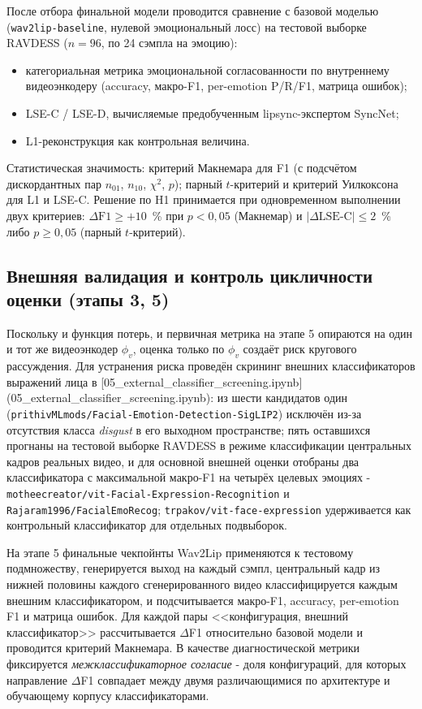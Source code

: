 \documentclass[a4paper, 12pt, oneside, openany]{article}
\begin{document}
После отбора финальной модели проводится сравнение с базовой моделью (\texttt{wav2lip-baseline}, нулевой эмоциональный лосс) на тестовой выборке RAVDESS ($n=96$, по 24 сэмпла на эмоцию):
\begin{itemize}
\item категориальная метрика эмоциональной согласованности по внутреннему видеоэнкодеру (accuracy, макро-F1, per-emotion P/R/F1, матрица ошибок);
\item LSE-C / LSE-D, вычисляемые предобученным lipsync-экспертом SyncNet;
\item L1-реконструкция как контрольная величина.
\end{itemize}
Статистическая значимость: критерий Макнемара для F1 (с подсчётом дискордантных пар $n_{01}$, $n_{10}$, $\chi^2$, $p$); парный $t$-критерий и критерий Уилкоксона для L1 и LSE-C. Решение по H1 принимается при одновременном выполнении двух критериев: $\Delta\text{F1} \geq +10$~\% при $p < 0{,}05$ (Макнемар) и $|\Delta\text{LSE-C}| \leq 2$~\% либо $p \geq 0{,}05$ (парный $t$-критерий).

\subsection{Внешняя валидация и контроль цикличности оценки (этапы 3, 5)}

Поскольку и функция потерь, и первичная метрика на этапе 5 опираются на один и тот же видеоэнкодер $\phi_v$, оценка только по $\phi_v$ создаёт риск кругового рассуждения. Для устранения риска проведён скрининг внешних классификаторов выражений лица в [05\_external\_classifier\_screening.ipynb](05\_external\_classifier\_screening.ipynb): из шести кандидатов один (\texttt{prithivMLmods/Facial-Emotion-Detection-SigLIP2}) исключён из-за отсутствия класса \textit{disgust} в его выходном пространстве; пять оставшихся прогнаны на тестовой выборке RAVDESS в режиме классификации центральных кадров реальных видео, и для основной внешней оценки отобраны два классификатора с максимальной макро-F1 на четырёх целевых эмоциях - \texttt{motheecreator/vit-Facial-Expression-Recognition} и \texttt{Rajaram1996/FacialEmoRecog}; \texttt{trpakov/vit-face-expression} удерживается как контрольный классификатор для отдельных подвыборок.

На этапе 5 финальные чекпойнты Wav2Lip применяются к тестовому подмножеству, генерируется выход на каждый сэмпл, центральный кадр из нижней половины каждого сгенерированного видео классифицируется каждым внешним классификатором, и подсчитывается макро-F1, accuracy, per-emotion F1 и матрица ошибок. Для каждой пары <<конфигурация, внешний классификатор>> рассчитывается $\Delta$F1 относительно базовой модели и проводится критерий Макнемара. В качестве диагностической метрики фиксируется \textit{межклассификаторное согласие} - доля конфигураций, для которых направление $\Delta$F1 совпадает между двумя различающимися по архитектуре и обучающему корпусу классификаторами.
\end{document}
